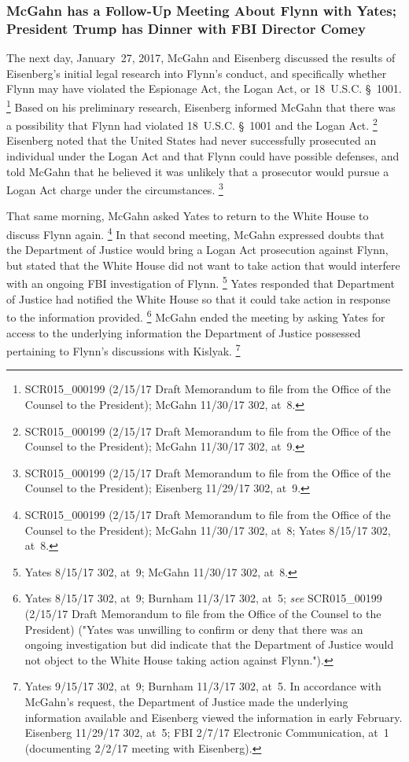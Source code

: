 \subsubsection{McGahn has a Follow-Up Meeting About Flynn with Yates; President Trump has Dinner with FBI Director Comey}

The next day, January~27, 2017, McGahn and Eisenberg discussed the results of Eisenberg's initial legal research into Flynn's conduct, and specifically whether Flynn may have violated the Espionage Act, the Logan Act, or 18~U.S.C. \S~1001.%
\footnote{SCR015\_000199 (2/15/17 Draft Memorandum to file from the Office of the Counsel to the President);
McGahn 11/30/17 302, at~8.}
Based on his preliminary research, Eisenberg informed McGahn that there was a possibility that Flynn had violated 18~U.S.C. \S~1001 and the Logan Act.%
\footnote{SCR015\_000199 (2/15/17 Draft Memorandum to file from the Office of the Counsel to the President);
McGahn 11/30/17 302, at~9.}
Eisenberg noted that the United States had never successfully prosecuted an individual under the Logan Act and that Flynn could have possible defenses, and told McGahn that he believed it was unlikely that a prosecutor would pursue a Logan Act charge under the circumstances.%
\footnote{SCR015\_000199 (2/15/17 Draft Memorandum to file from the Office of the Counsel to the President);
Eisenberg 11/29/17 302, at~9.}

That same morning, McGahn asked Yates to return to the White House to discuss Flynn again.%
\footnote{SCR015\_000199 (2/15/17 Draft Memorandum to file from the Office of the Counsel to the President);
McGahn 11/30/17 302, at~8;
Yates 8/15/17 302, at~8.}
In that second meeting, McGahn expressed doubts that the Department of Justice would bring a Logan Act prosecution against Flynn, but stated that the White House did not want to take action that would interfere with an ongoing FBI investigation of Flynn.%
\footnote{Yates 8/15/17 302, at~9;
McGahn 11/30/17 302, at~8.}
Yates responded that Department of Justice had notified the White House so that it could take action in response to the information provided.%
\footnote{Yates 8/15/17 302, at~9;
Burnham 11/3/17 302, at~5;
\textit{see} SCR015\_00199 (2/15/17 Draft Memorandum to file from the Office of the Counsel to the President) ("Yates was unwilling to confirm or deny that there was an ongoing investigation but did indicate that the Department of Justice would not object to the White House taking action against Flynn.").}
McGahn ended the meeting by asking Yates for access to the underlying information the Department of Justice possessed pertaining to Flynn's discussions with Kislyak.%
\footnote{Yates 9/15/17 302, at~9;
Burnham 11/3/17 302, at~5.
In accordance with McGahn's request, the Department of Justice made the underlying information available and Eisenberg viewed the information in early February.
Eisenberg 11/29/17 302, at~5;
FBI 2/7/17 Electronic Communication, at~1 (documenting 2/2/17 meeting with Eisenberg).}

